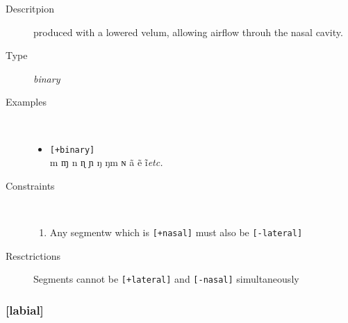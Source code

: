 \documentclass[10pt,letterpaper]{article}
\begin{document}
\begin{description}
\item[Descritpion] produced with a lowered velum, allowing airflow throuh the nasal cavity.
\item[Type] \emph{binary}
\item[Examples]\
  \begin{itemize}
    \item \texttt{[+binary]}\\
    m ɱ n ɳ ɲ ŋ ŋm ɴ ã ẽ ĩ\emph{etc.}
  \end{itemize}
\item[Constraints]\
  \begin{enumerate}
    \item Any segmentw which is \texttt{[+nasal]} must also be \texttt{[-lateral]}
  \end{enumerate}
\item[Resctrictions] Segments cannot be \texttt{[+lateral]} and \texttt{[-nasal]} simultaneously
\end{description}

\subsubsection{[labial]}
\label{ssub:feature_labial}


\end{document}
